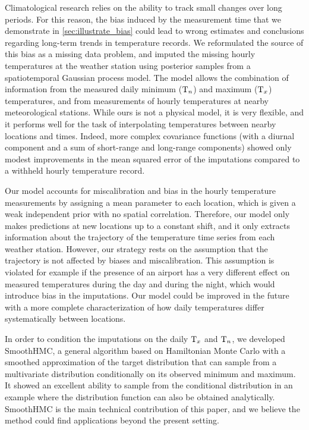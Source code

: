 \documentclass[12pt]{article}
\begin{document}
Climatological research relies on the ability to track small changes over long periods.
For this reason, the bias induced by the measurement time
that we demonstrate in \autoref{sec:illustrate_bias}
could lead to wrong estimates and conclusions regarding long-term trends in temperature records.
We reformulated the source of this bias as a missing data problem, and imputed the missing hourly temperatures at the weather station using posterior samples from a spatiotemporal Gaussian process model.
The model allows the combination of information from the measured daily minimum (\(\mathrm{T}_{n}\)) and maximum (\(\mathrm{T}_{x}\)) temperatures, and from measurements of hourly temperatures at nearby meteorological stations.
While ours is not a physical model, it is very flexible, and it performs well for the task of interpolating temperatures between nearby locations and times.
Indeed, more complex covariance functions (with a diurnal component and a sum of short-range and long-range components) showed only modest improvements in the mean squared error of the imputations compared to a withheld hourly temperature record.

Our model accounts for miscalibration and bias in the hourly temperature measurements by assigning a mean parameter to each location, which is given a weak independent prior with no spatial correlation.
Therefore, our model only makes predictions at new locations up to a constant shift, and it only extracts information about the trajectory of the temperature time series from each weather station.
However, our strategy rests on the assumption that the trajectory is not affected by biases and miscalibration.
This assumption is violated for example if the presence of an airport has a very different effect on measured temperatures during the day and during the night, which would introduce bias in the imputations.
Our model could be improved in the future with a more complete characterization of how daily temperatures differ systematically between locations.

In order to condition the imputations on the daily \(\mathrm{T}_{x}\) and \(\mathrm{T}_{n}\), we developed SmoothHMC, a general algorithm based on Hamiltonian Monte Carlo with a smoothed approximation of the target distribution that can sample from a multivariate distribution conditionally on its observed minimum and maximum.
It showed an excellent ability to sample from the conditional distribution in an example where the distribution function can also be obtained analytically.
SmoothHMC is the main technical contribution of this paper, and we believe the method could find applications beyond the present setting.
\end{document}
